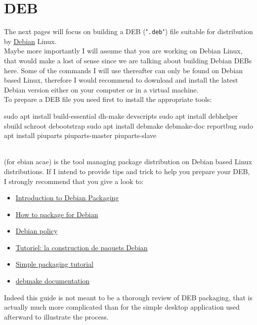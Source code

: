 \section{DEB}

\newcommand{\ddir}{"\bftt{debian}" directory}
\newcommand{\dpkg}{"\bftt{dpkg}" command}

The next pages will focus on building a DEB ("\texttt{.deb}") file suitable for distribution by \href{https://www.debian.org}{Debian} Linux. \\[0.25cm]
Maybe more importantly I will assume that you are working on Debian Linux, that would make
a lost of sense since we are talking about building Debian DEBs here. Some of the commands
I will use thereafter can only be found on Debian based Linux, therefore I would recommend to download
and install the latest Debian version either on your computer or in a virtual machine. \\[0.25cm]
To prepare a DEB file you need first to install the appropriate tools:
{\small{
\begin{script}
\uprompt{~} sudo apt install build-essential dh-make devscripts 
\uprompt{~} sudo apt install debhelper sbuild schroot debootstrap
\uprompt{~} sudo apt install debmake debmake-doc reportbug 
\uprompt{~} sudo apt install piuparts piuparts-master piuparts-slave
\end{script}
}}
\\[-0.25cm]
\noindent {} (for ebian acae) is the tool managing package distribution on Debian based Linux distributions. 
If I intend to provide tips and trick to help you prepare your DEB, I strongly recommend that you give a look to:
\begin{itemize}
\item \href{https://wiki.debian.org/Packaging/Intro?action=show\&redirect=IntroDebianPackaging}{Introduction to Debian Packaging}
\item \href{https://wiki.debian.org/HowToPackageForDebian}{How to package for Debian}
\item \href{https://www.debian.org/doc/debian-policy/}{Debian policy}
\item \href{https://www.debian.org/doc/manuals/packaging-tutorial/packaging-tutorial.fr.pdf}{Tutoriel: la construction de paquets Debian}
\item \href{https://wiki.debian.org/SimplePackagingTutorial}{Simple packaging tutorial}
\item \href{file://usr/share/doc/debmake-doc/}{debmake documentation}
\end{itemize}
Indeed this guide is not meant to be a thorough review of DEB packaging, that is actually
much more complicated than for the simple desktop application used afterward to illustrate the process.

